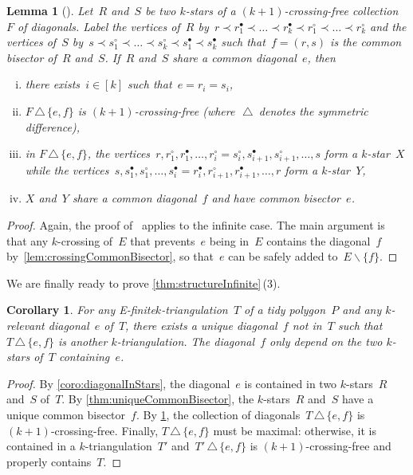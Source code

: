 \documentclass{amsart}
\newtheorem{lemma}[theorem]{Lemma}
\newtheorem{corollary}[theorem]{Corollary}
\theoremstyle{remark}
\newcommand{\ssm}{\smallsetminus} %
\newcommand{\symdif}{\,\triangle\,} %
\newcommand*{\ef}[0]{E-finite\xspace}
\newcommand*{\ktg}[0]{$k$-triangulation\xspace}
\newcommand{\cl}{\prec}
\begin{document}
\begin{lemma}[{\cite[Lem.~3.8]{PilaudSantos-multitriangulations}}]
\label{lem:flip}
Let~$R$ and~$S$ be two $k$-stars of a $(k+1)$-crossing-free collection~$F$ of diagonals.
Label the vertices of~$R$ by~$r \cl r^\bullet_1 \cl \dots \cl r^\bullet_k \cl r^\circ_1 \cl \dots \cl r^\circ_k$ and the vertices of~$S$ by~$s \cl s^\circ_1 \cl \dots \cl s^\circ_k \cl s^\bullet_1 \cl s^\bullet_k$ such that~$f = (r,s)$ is the common bisector of~$R$ and~$S$.
If~$R$ and~$S$ share a common diagonal~$e$, then
\begin{enumerate}[(i)]
\item there exists~$i \in [k]$ such that~$e = r_i = s_i$,
\item $F \symdif \{e,f\}$ is $(k+1)$-crossing-free (where~$\symdif$ denotes the symmetric difference),
\item in $F \symdif \{e,f\}$, the vertices~$r, r^\circ_1, r^\bullet_1, \dots, r^\circ_i = s^\circ_i, s^\bullet_{i+1}, s^\circ_{i+1}, \dots, s$ form a $k$-star~$X$ while the vertices~$s, s^\bullet_1, s^\circ_1, \dots, s^\bullet_i = r^\bullet_i, r^\circ_{i+1}, r^\bullet_{i+1}, \dots, r$ form a $k$-star~$Y$,
\item $X$ and~$Y$ share a common diagonal~$f$ and have common bisector~$e$.
\end{enumerate}
\end{lemma}

\begin{proof}
Again, the proof of~\cite[Lem.~3.8]{PilaudSantos-multitriangulations} applies to the infinite case.
The main argument is that any $k$-crossing of~$E$ that prevents~$e$ being in~$E$ contains the diagonal~$f$ by~\cref{lem:crossingCommonBisector}, so that~$e$ can be safely added to~$E \ssm \{f\}$.
\end{proof}

We are finally ready to prove \cref{thm:structureInfinite}\,(3).

\begin{corollary}
For any \ef \ktg~$T$ of a tidy polygon~$P$ and any $k$-relevant diagonal~$e$ of~$T$, there exists a unique diagonal~$f$ not in~$T$ such that~$T \symdif \{e,f\}$ is another $k$-triangulation. The diagonal~$f$ only depend on the two $k$-stars of~$T$ containing~$e$.
\end{corollary}

\begin{proof}
By \cref{coro:diagonalInStars}, the diagonal~$e$ is contained in two $k$-stars~$R$ and~$S$ of~$T$.
By \cref{thm:uniqueCommonBisector}, the $k$-stars~$R$ and~$S$ have a unique common bisector~$f$.
By \cref{lem:flip}, the collection of diagonals~$T \symdif \{e,f\}$ is $(k+1)$-crossing-free.
Finally, $T \symdif \{e,f\}$ must be maximal: otherwise, it is contained in a $k$-triangulation~$T'$ and~$T' \symdif \{e,f\}$ is $(k+1)$-crossing-free and properly contains~$T$.
\end{proof}
\end{document}
